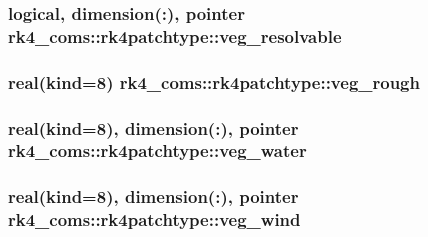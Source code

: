 \subsubsection[{veg\+\_\+resolvable}]{\setlength{\rightskip}{0pt plus 5cm}logical, dimension(\+:), pointer rk4\+\_\+coms\+::rk4patchtype\+::veg\+\_\+resolvable}\label{structrk4__coms_1_1rk4patchtype_a646adef70872d67b500e084e2da9ba29}
\hypertarget{structrk4__coms_1_1rk4patchtype_aece3a3b1e478a912b45ecf0f983a55af}{}
\subsubsection[{veg\+\_\+rough}]{\setlength{\rightskip}{0pt plus 5cm}real(kind=8) rk4\+\_\+coms\+::rk4patchtype\+::veg\+\_\+rough}\label{structrk4__coms_1_1rk4patchtype_aece3a3b1e478a912b45ecf0f983a55af}
\hypertarget{structrk4__coms_1_1rk4patchtype_a1296b8fd601c87529f51088f2fef705e}{}
\subsubsection[{veg\+\_\+water}]{\setlength{\rightskip}{0pt plus 5cm}real(kind=8), dimension(\+:), pointer rk4\+\_\+coms\+::rk4patchtype\+::veg\+\_\+water}\label{structrk4__coms_1_1rk4patchtype_a1296b8fd601c87529f51088f2fef705e}
\hypertarget{structrk4__coms_1_1rk4patchtype_a7ff27fa03dd3d519ba57b7ff8e04540b}{}
\subsubsection[{veg\+\_\+wind}]{\setlength{\rightskip}{0pt plus 5cm}real(kind=8), dimension(\+:), pointer rk4\+\_\+coms\+::rk4patchtype\+::veg\+\_\+wind}\label{structrk4__coms_1_1rk4patchtype_a7ff27fa03dd3d519ba57b7ff8e04540b}
\hypertarget{structrk4__coms_1_1rk4patchtype_af6350a3ee829a6afd11b225c55393616}{}

